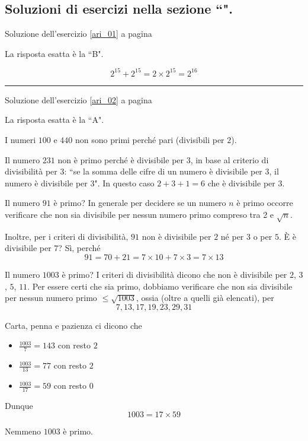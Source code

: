 

\subsection{Soluzioni di esercizi nella sezione ``\textbf{}".}

Soluzione dell'esercizio \ref{ari_01} a pagina \pageref{ari_01}\label{aris_01}

La risposta esatta è la ``B".

\[
2^{15} + 2^{15} = 2 \times 2^{15} = 2^{16}
\]


\vspace{1cm}
\hrule
\vspace{1cm}


Soluzione dell'esercizio \ref{ari_02} a pagina \pageref{ari_02}\label{aris_02}

La risposta esatta è la ``A".

I numeri $100$ e $440$ non sono primi perché pari (divisibili per $2$).


Il numero $231$ non è primo perché è divisibile per $3$, in base al criterio di divisibilità per
3: ``se la somma delle cifre di un numero è divisibile per 3, il numero è divisibile per 3".  In questo 
caso $2 + 3 + 1 = 6$ che è divisibile per 3.

Il numero $91$ è primo?
In generale per decidere se un numero $n$ è primo occorre veriﬁcare che non sia divisibile per nessun numero 
primo compreso tra 2 e $\sqrt{n}$.

Inoltre, per i criteri di divisibilità, $91$ non è divisibile per $2$ né per $3$ o per $5$.
È è divisibile per $7$?
Sì, perché
\[
 91 = 70 + 21 = 7 \times 10 + 7 \times 3 = 7 \times 13
\]

Il numero $1003$ è primo? I criteri di divisibilità dicono che non è divisibile per $2$, $3$, $5$, $11$.
Per essere certi che sia primo, dobbiamo veriﬁcare che non sia divisibile per nessun numero
primo $\leq \sqrt{1003}$, ossia (oltre a quelli già elencati), per
\[
7, 13, 17, 19, 23, 29, 31
\]

Carta, penna e pazienza ci dicono che
\begin{itemize}
\item $\frac{1003}{7}= 143$ con resto $2$
\item $\frac{1003}{13} = 77$ con resto $2$
\item $\frac{1003}{17} = 59$ con resto $0$
\end{itemize}

Dunque 
\[
1003 = 17 \times 59
\]

Nemmeno $1003$ è primo. 


